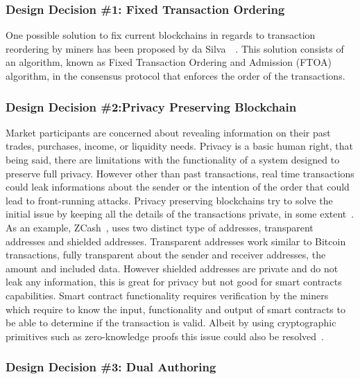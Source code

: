 \subsubsection{Design Decision \#1: Fixed Transaction Ordering\newline}

One possible solution to fix current blockchains in regards to transaction reordering by miners has been proposed by da Silva~\etal~\cite{fixedordering2018silva}. This solution consists of an algorithm, known as Fixed Transaction Ordering and Admission (FTOA) algorithm, in the consensus protocol that enforces the order of the transactions. 

\subsubsection{Design Decision \#2:Privacy Preserving Blockchain\newline}

Market participants are concerned about revealing information on their past trades, purchases, income, or liquidity needs. Privacy is a basic human right, that being said, there are limitations with the functionality of a system designed to preserve full privacy. However other than past transactions, real time transactions could leak informations about the sender or the intention of the order that could lead to front-running attacks. Privacy preserving blockchains try to solve the initial issue by keeping all the details of the transactions private, in some extent~\cite{miller2017empirical, kappos2018empirical}. 
As an example, ZCash~\cite{hopwood2016zcash}, uses two distinct type of addresses, transparent addresses and shielded addresses. Transparent addresses work similar to Bitcoin transactions, fully transparent about the sender and receiver addresses, the amount and included data. However shielded addresses are private and do not leak any information, this is great for privacy but not good for smart contracts capabilities. Smart contract functionality requires verification by the miners which require to know the input, functionality and output of smart contracts to be able to determine if the transaction is valid. Albeit by using cryptographic primitives such as zero-knowledge proofs this issue could also be resolved~\cite{kosba2016hawk}. 


\subsubsection{Design Decision \#3: Dual Authoring\newline}

